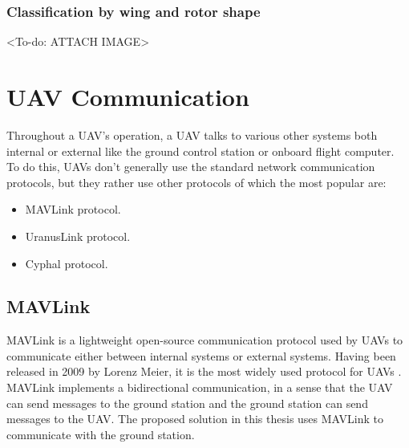 


\subsubsection*{Classification by wing and rotor shape}

<To-do: ATTACH IMAGE>





\section{UAV Communication}
\label{sec:uav-communication}

Throughout a UAV's operation, a UAV talks to various other systems both internal or external like the ground control station or onboard flight computer. To do this, UAVs don't generally use the standard network communication protocols, but they rather use other protocols of which the most popular are:

\begin{itemize}
    \item MAVLink protocol.
    \item UranusLink protocol.
    \item Cyphal protocol.
\end{itemize}

\subsection{MAVLink}
\label{subsec:mavlink}

MAVLink is a lightweight open-source communication protocol used by UAVs to communicate either between internal systems or external systems. Having been released in 2009 by Lorenz Meier, it is the most widely used protocol for UAVs \cite{mavlinkdocumentation}. MAVLink implements a bidirectional communication, in a sense that the UAV can send messages to the ground station and the ground station can send messages to the UAV. The proposed solution in this thesis uses MAVLink to communicate with the ground station.

